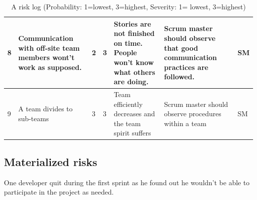 \begin{table}[H]
{\begin{tabular}{|p{0.5cm}|p{3cm}|p{1cm}|p{1.5cm}|p{4cm}|p{4cm}|p{1cm}|}
8 &
Communication with off-site team members wont't work as supposed. &
2 &
3 &
Stories are not finished on time. People won't know what others are doing. &
Scrum master should observe that good communication practices are followed. &
SM 
\\
\hline

9 &
A team divides to sub-teams &
3 &
3 &
Team efficiently decreases and the team spirit suffers &
Scrum master should observe procedures within a team &
SM
\\
\hline

\end{tabular} 
}
\caption{A risk log (Probability: 1=lowest, 3=highest, Severity: 1= lowest, 
3=highest)}
\label{table:Risklog}
\end{table}

\subsection{Materialized risks}

One developer quit during the first sprint as he found out he wouldn't be able to participate in the project as needed.

